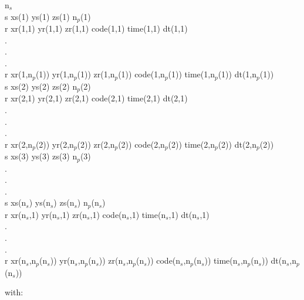 \documentclass[twoside,final,onecolumn]{article}
\begin{document}
\begin{framed}
\noindent n$_{s}$\\
s xs(1) ys(1) zs(1) n$_{p}$(1)\\
r xr(1,1) yr(1,1) zr(1,1) code(1,1) time(1,1) dt(1,1)\\
.\\
.\\
.\\
r xr(1,n$_{p}$(1)) yr(1,n$_{p}$(1)) zr(1,n$_{p}$(1)) code(1,n$_{p}$(1)) time(1,n$_{p}$(1)) dt(1,n$_{p}$(1))\\
s xs(2) ys(2) zs(2) n$_{p}$(2)\\
r xr(2,1) yr(2,1) zr(2,1) code(2,1) time(2,1) dt(2,1)\\
.\\
.\\
.\\
r xr(2,n$_{p}$(2)) yr(2,n$_{p}$(2)) zr(2,n$_{p}$(2)) code(2,n$_{p}$(2)) time(2,n$_{p}$(2)) dt(2,n$_{p}$(2))\\
s xs(3) ys(3) zs(3) n$_{p}$(3)\\
.\\
.\\
.\\
s xs(n$_{s}$) ys(n$_{s}$) zs(n$_{s}$) n$_{p}$(n$_{s}$)\\
r xr(n$_{s}$,1) yr(n$_{s}$,1) zr(n$_{s}$,1) code(n$_{s}$,1) time(n$_{s}$,1) dt(n$_{s}$,1)\\
.\\
.\\
.\\
r xr(n$_{s}$,n$_{p}$(n$_{s}$)) yr(n$_{s}$,n$_{p}$(n$_{s}$)) zr(n$_{s}$,n$_{p}$(n$_{s}$)) code(n$_{s}$,n$_{p}$(n$_{s}$)) time(n$_{s}$,n$_{p}$(n$_{s}$)) dt(n$_{s}$,n$_{p}$(n$_{s}$))
\end{framed}

with:\\
\end{document}
